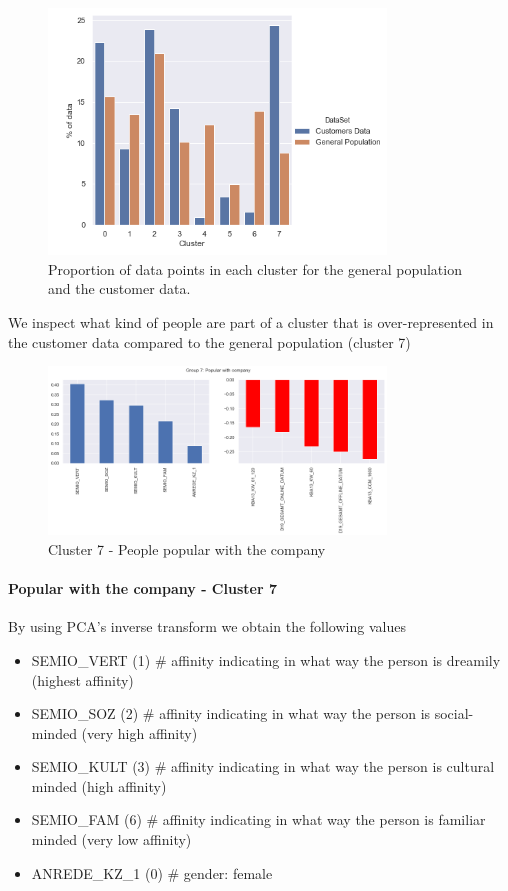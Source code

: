 \begin{figure}[h]
\centering
\includegraphics[width=0.8\textwidth, height=0.5\textwidth]{images/clusters.png}
\caption{Proportion of data points in each cluster for the general population and the customer data. }
\label{fig:clusters}
\end{figure}

We inspect what kind of people are part of a cluster that is over-represented in the customer data compared to the general population (cluster 7)

\begin{figure}[h]
\centering
\includegraphics[width=0.8\textwidth, height=0.5\textwidth]{images/over_cluster.png}
\caption{Cluster 7 - People popular with the company }
\label{fig:overcluster}
\end{figure}

\paragraph{Popular with the company - Cluster 7} By using PCA's inverse transform we obtain the following values
\begin{itemize}
    \item SEMIO\_VERT (1) \# affinity indicating in what way the person is dreamily (highest affinity)
    \item SEMIO\_SOZ (2) \# affinity indicating in what way the person is social-minded (very high affinity)
    \item SEMIO\_KULT (3) \# affinity indicating in what way the person is cultural minded (high affinity)
    \item SEMIO\_FAM (6) \# affinity indicating in what way the person is familiar minded (very low affinity)
    \item ANREDE\_KZ\_1 (0) \# gender: female
\end{itemize}

